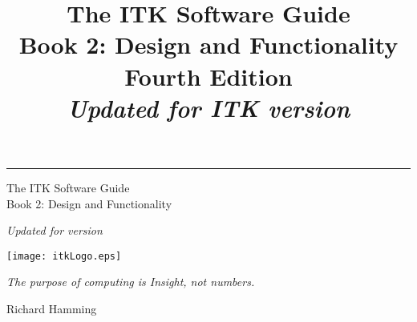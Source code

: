 \documentclass{InsightSoftwareGuide}
\title{The ITK Software Guide\\Book 2: Design and Functionality\\Fourth Edition\\ \emph{Updated for ITK version
\ITKVERSIONMAJORMINORPATCH}}
\begin{document}
\ifitkPrintedVersion

  \begin{minipage}[t][3cm][b]{\textwidth}
  \rule{14cm}{1pt}
  \end{minipage}

  \begin{minipage}[t][3cm][b]{\textwidth}
  \Huge
  The ITK Software Guide\\
  Book 2: Design and Functionality\\
  \normalsize
  \par
  \emph{Updated for version \ITKVERSIONMAJORMINORPATCH}\\

  \end{minipage}

  
  

\fi

\maketitle
\ifitkPrintedVersion
\fi

\frontmatter



%
%
%
\cleardoublepage

\begin{minipage}[t][10cm][b]{\textwidth}
\center
\texttt{[image: itkLogo.eps]}
\large
\begin{center}
\emph{The purpose of computing is Insight, not numbers.}\\
\end{center}
\hspace{8cm} Richard Hamming
\normalsize
\end{minipage}



%
\pagestyle{plain}
%


\ifitkPrintedVersion
  
\fi




\end{document}
